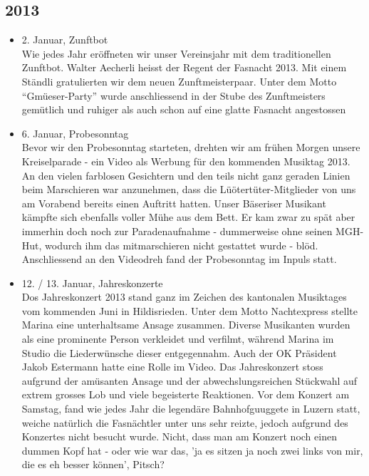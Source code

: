 \subsection*{2013}
\begin{history}


    \begin{itemize}

        \item 2. Januar, Zunftbot\\
              Wie jedes Jahr eröffneten wir unser Vereinsjahr mit dem traditionellen
              Zunftbot. Walter Aecherli heisst der Regent der Fasnacht 2013. Mit einem
              Ständli gratulierten wir dem neuen Zunftmeisterpaar. Unter dem Motto
              \enquote{Gmüeser-Party} wurde anschliessend in der Stube des
              Zunftmeisters gemütlich und ruhiger als auch schon auf eine glatte
              Fasnacht angestossen

        \item 6. Januar, Probesonntag\\
              Bevor wir den Probesonntag starteten, drehten wir am frühen Morgen
              unsere Kreiselparade - ein Video als Werbung für den kommenden Musiktag
              2013. An den vielen farblosen Gesichtern und den teils nicht ganz
              geraden Linien beim Marschieren war anzunehmen, dass die
              Lüötertüter-Mitglieder von uns am Vorabend bereits einen Auftritt
              hatten. Unser Bäseriser Musikant kämpfte sich ebenfalls voller Mühe aus
              dem Bett. Er kam zwar zu spät aber immerhin doch noch zur
              Paradenaufnahme - dummerweise ohne seinen MGH-Hut, wodurch ihm das
              mitmarschieren nicht gestattet wurde - blöd. Anschliessend an den
              Videodreh fand der Probesonntag im Inpuls statt.

        \item 12. / 13. Januar, Jahreskonzerte\\
              Dos Jahreskonzert 2013 stand ganz im Zeichen des kantonalen Musiktages
              vom kommenden Juni in Hildisrieden. Unter dem Motto Nachtexpress stellte
              Marina eine unterhaltsame Ansage zusammen. Diverse Musikanten wurden als
              eine prominente Person verkleidet und verfilmt, während Marina im Studio
              die Liederwünsche dieser entgegennahm. Auch der OK Präsident Jakob
              Estermann hatte eine Rolle im Video. Das Jahreskonzert stoss aufgrund
              der amüsanten Ansage und der abwechslungsreichen Stückwahl auf extrem
              grosses Lob und viele begeisterte Reaktionen. Vor dem Konzert am
              Samstag, fand wie jedes Jahr die legendäre Bahnhofguuggete in Luzern
              statt, weiche natürlich die Fasnächtler unter uns sehr reizte, jedoch
              aufgrund des Konzertes nicht besucht wurde. Nicht, dass man am Konzert
              noch einen dummen Kopf hat - oder wie war das, 'ja es sitzen ja noch
              zwei links von mir, die es eh besser können’, Pitsch?


\end{itemize}
\end{history}
